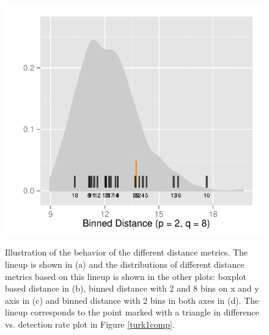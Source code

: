 \documentclass[12]{article}
\begin{document}
\begin{figure}[hbtp]
{\includegraphics[scale=0.7]{distribution-bin-dist-2-8-exp1.pdf}
\label{t1bin_1}
}
	\vspace{-.1in}
\caption[Optional caption for list of figures]{Illustration of the behavior of the different distance metrics. The lineup is shown in (a) and the distributions of different distance metrics based on this lineup is shown in the other plots: boxplot based distance in (b), binned distance with 2 and 8 bins on x and y axis in (c) and binned distance with 2 bins in both axes in (d). The lineup corresponds to the point marked with a triangle in difference vs. detection rate plot in Figure \ref{turk1comp}. }
\label{turk1-exp}
\end{figure}
\end{document}
